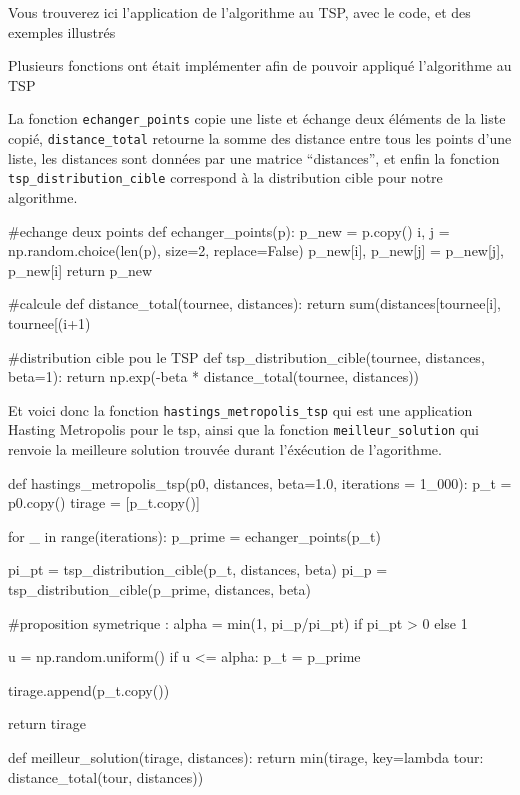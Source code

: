 \documentclass{article}
\begin{document}
Vous trouverez ici l'application de l'algorithme au TSP, avec le code, et des exemples illustrés  

Plusieurs fonctions ont était implémenter afin de pouvoir appliqué l'algorithme au TSP

La fonction \texttt{echanger\_points} copie une liste et échange deux éléments de la liste copié, 
\texttt{distance\_total} retourne la somme des distance entre tous les points d'une liste, les distances sont données par une matrice ``distances'',
et enfin la fonction \texttt{tsp\_distribution\_cible} correspond à la distribution cible pour notre algorithme. 

\newpage
\begin{center}
\begin{python}
#echange deux points
def echanger_points(p):
    p_new = p.copy()
    i, j = np.random.choice(len(p), size=2, replace=False)
    p_new[i], p_new[j] = p_new[j], p_new[i]
    return p_new

#calcule 
def distance_total(tournee, distances):
    return sum(distances[tournee[i], tournee[(i+1) %

#distribution cible pou le TSP
def tsp_distribution_cible(tournee, distances, beta=1):
    return np.exp(-beta * distance_total(tournee, distances))
    

\end{python}
\end{center}

Et voici donc la fonction \texttt{hastings\_metropolis\_tsp} qui est une application Hasting Metropolis pour le tsp, 
ainsi que la fonction \texttt{meilleur\_solution} qui renvoie la meilleure solution trouvée durant l'éxécution de l'agorithme. 

\begin{center}
\begin{python}
def hastings_metropolis_tsp(p0, distances, beta=1.0, iterations = 1_000):
    p_t = p0.copy()
    tirage = [p_t.copy()]

    for _ in range(iterations):
        p_prime = echanger_points(p_t)

        pi_pt = tsp_distribution_cible(p_t, distances, beta)
        pi_p = tsp_distribution_cible(p_prime, distances, beta)

        #proposition symetrique :
        alpha = min(1, pi_p/pi_pt) if pi_pt > 0 else 1

        u = np.random.uniform()
        if u <= alpha:
            p_t = p_prime
        
        tirage.append(p_t.copy())
    
    return tirage

def meilleur_solution(tirage, distances):
    return min(tirage, key=lambda tour: distance_total(tour, distances))

\end{python}
\end{center}
\end{document}
